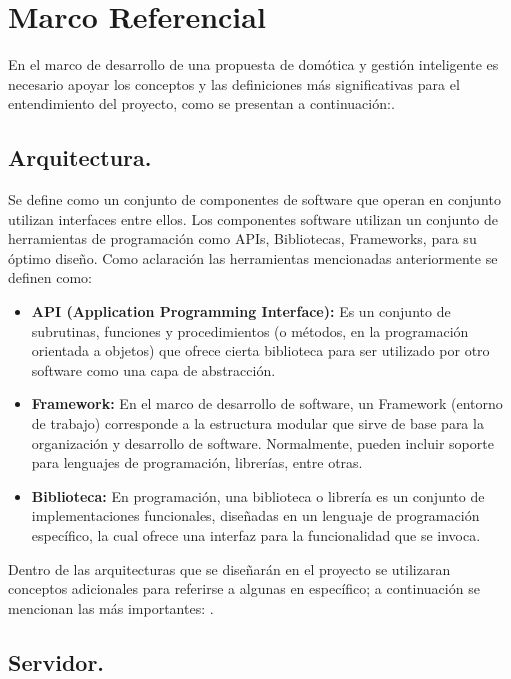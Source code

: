 \section{Marco Referencial}

En el marco de desarrollo de una propuesta de domótica y gestión inteligente es necesario apoyar los conceptos y las definiciones más significativas para el entendimiento del proyecto, como se presentan a continuación:\cite{Nosratabadi2017a}.

\subsection{Arquitectura.}
Se define como un conjunto de componentes de software que operan en conjunto utilizan interfaces entre ellos. Los componentes software utilizan un conjunto de herramientas de programación como APIs, Bibliotecas, Frameworks, para su óptimo diseño. Como aclaración las herramientas mencionadas anteriormente se definen como:

\begin{itemize}
	\item \textbf{API (Application Programming Interface):} Es un conjunto de subrutinas, funciones y procedimientos (o métodos, en la programación orientada a objetos) que ofrece cierta biblioteca para ser utilizado por otro software como una capa de abstracción.
    
	\item \textbf{Framework:} En el marco de desarrollo de software, un Framework (entorno de trabajo) corresponde a la estructura  modular que sirve de base para la organización y desarrollo de software. Normalmente, pueden incluir soporte para lenguajes de programación, librerías, entre otras. 
	\item \textbf{Biblioteca:} En programación, una biblioteca o librería es un conjunto de implementaciones funcionales, diseñadas en un lenguaje de programación específico, la cual ofrece una interfaz para la funcionalidad que se invoca.
\end{itemize}

Dentro de las arquitecturas que se diseñarán en el proyecto se utilizaran conceptos adicionales para referirse a algunas en específico; a continuación se mencionan las más importantes: \cite{Palizban2014}. 

\subsection{Servidor.}

